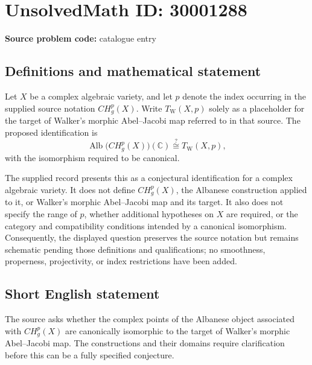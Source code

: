 \documentclass[11pt]{article}
\newcommand{\C}{\mathbb{C}}
\begin{document}
\section*{UnsolvedMath ID: 30001288}
\textbf{Source problem code:} catalogue entry
\subsection{Definitions and mathematical statement}
Let \(X\) be a complex algebraic variety, and let \(p\) denote the index occurring in the supplied source notation \(CH_g^p(X)\). Write \(T_{\mathrm W}(X,p)\) solely as a placeholder for the target of Walker's morphic Abel--Jacobi map referred to in that source. The proposed identification is
\[
\operatorname{Alb}\bigl(CH_g^p(X)\bigr)(\C)
\overset{?}{\cong}
T_{\mathrm W}(X,p),
\]
with the isomorphism required to be canonical.

The supplied record presents this as a conjectural identification for a complex algebraic variety. It does not define \(CH_g^p(X)\), the Albanese construction applied to it, or Walker's morphic Abel--Jacobi map and its target. It also does not specify the range of \(p\), whether additional hypotheses on \(X\) are required, or the category and compatibility conditions intended by a canonical isomorphism. Consequently, the displayed question preserves the source notation but remains schematic pending those definitions and qualifications; no smoothness, properness, projectivity, or index restrictions have been added.
\subsection{Short English statement}
The source asks whether the complex points of the Albanese object associated with \(CH_g^p(X)\) are canonically isomorphic to the target of Walker's morphic Abel--Jacobi map. The constructions and their domains require clarification before this can be a fully specified conjecture.
\end{document}

